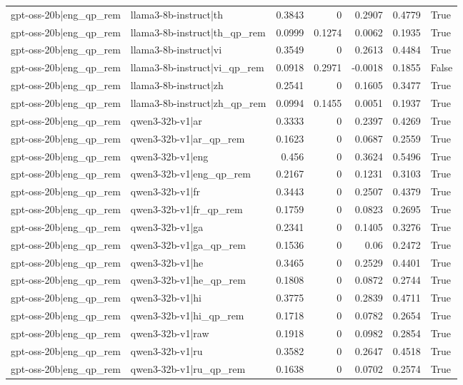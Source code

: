 \begin{table}
\begin{tabular}{l l r r r r l}
gpt-oss-20b|eng_qp_rem & llama3-8b-instruct|th & 0.3843 & 0 & 0.2907 & 0.4779 & True \\
gpt-oss-20b|eng_qp_rem & llama3-8b-instruct|th_qp_rem & 0.0999 & 0.1274 & 0.0062 & 0.1935 & True \\
gpt-oss-20b|eng_qp_rem & llama3-8b-instruct|vi & 0.3549 & 0 & 0.2613 & 0.4484 & True \\
gpt-oss-20b|eng_qp_rem & llama3-8b-instruct|vi_qp_rem & 0.0918 & 0.2971 & -0.0018 & 0.1855 & False \\
gpt-oss-20b|eng_qp_rem & llama3-8b-instruct|zh & 0.2541 & 0 & 0.1605 & 0.3477 & True \\
gpt-oss-20b|eng_qp_rem & llama3-8b-instruct|zh_qp_rem & 0.0994 & 0.1455 & 0.0051 & 0.1937 & True \\
gpt-oss-20b|eng_qp_rem & qwen3-32b-v1|ar & 0.3333 & 0 & 0.2397 & 0.4269 & True \\
gpt-oss-20b|eng_qp_rem & qwen3-32b-v1|ar_qp_rem & 0.1623 & 0 & 0.0687 & 0.2559 & True \\
gpt-oss-20b|eng_qp_rem & qwen3-32b-v1|eng & 0.456 & 0 & 0.3624 & 0.5496 & True \\
gpt-oss-20b|eng_qp_rem & qwen3-32b-v1|eng_qp_rem & 0.2167 & 0 & 0.1231 & 0.3103 & True \\
gpt-oss-20b|eng_qp_rem & qwen3-32b-v1|fr & 0.3443 & 0 & 0.2507 & 0.4379 & True \\
gpt-oss-20b|eng_qp_rem & qwen3-32b-v1|fr_qp_rem & 0.1759 & 0 & 0.0823 & 0.2695 & True \\
gpt-oss-20b|eng_qp_rem & qwen3-32b-v1|ga & 0.2341 & 0 & 0.1405 & 0.3276 & True \\
gpt-oss-20b|eng_qp_rem & qwen3-32b-v1|ga_qp_rem & 0.1536 & 0 & 0.06 & 0.2472 & True \\
gpt-oss-20b|eng_qp_rem & qwen3-32b-v1|he & 0.3465 & 0 & 0.2529 & 0.4401 & True \\
gpt-oss-20b|eng_qp_rem & qwen3-32b-v1|he_qp_rem & 0.1808 & 0 & 0.0872 & 0.2744 & True \\
gpt-oss-20b|eng_qp_rem & qwen3-32b-v1|hi & 0.3775 & 0 & 0.2839 & 0.4711 & True \\
gpt-oss-20b|eng_qp_rem & qwen3-32b-v1|hi_qp_rem & 0.1718 & 0 & 0.0782 & 0.2654 & True \\
gpt-oss-20b|eng_qp_rem & qwen3-32b-v1|raw & 0.1918 & 0 & 0.0982 & 0.2854 & True \\
gpt-oss-20b|eng_qp_rem & qwen3-32b-v1|ru & 0.3582 & 0 & 0.2647 & 0.4518 & True \\
gpt-oss-20b|eng_qp_rem & qwen3-32b-v1|ru_qp_rem & 0.1638 & 0 & 0.0702 & 0.2574 & True \\

\end{tabular}
\end{table}
